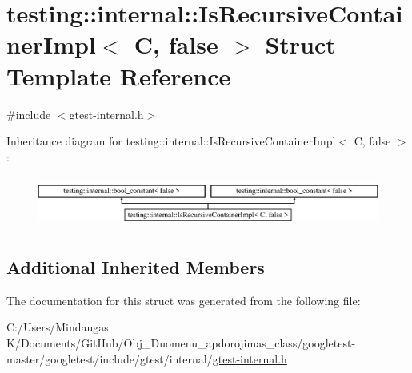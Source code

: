 \hypertarget{structtesting_1_1internal_1_1_is_recursive_container_impl_3_01_c_00_01false_01_4}{}\section{testing\+::internal\+::Is\+Recursive\+Container\+Impl$<$ C, false $>$ Struct Template Reference}
\label{structtesting_1_1internal_1_1_is_recursive_container_impl_3_01_c_00_01false_01_4}


{\ttfamily \#include $<$gtest-\/internal.\+h$>$}

Inheritance diagram for testing\+::internal\+::Is\+Recursive\+Container\+Impl$<$ C, false $>$\+:\begin{figure}[H]
\begin{center}
\leavevmode
\includegraphics[height=1.739130cm]{d6/d81/structtesting_1_1internal_1_1_is_recursive_container_impl_3_01_c_00_01false_01_4}
\end{center}
\end{figure}
\subsection*{Additional Inherited Members}


The documentation for this struct was generated from the following file\+:\begin{DoxyCompactItemize}
\item 
C\+:/\+Users/\+Mindaugas K/\+Documents/\+Git\+Hub/\+Obj\+\_\+\+Duomenu\+\_\+apdorojimas\+\_\+class/googletest-\/master/googletest/include/gtest/internal/\mbox{\hyperlink{googletest-master_2googletest_2include_2gtest_2internal_2gtest-internal_8h}{gtest-\/internal.\+h}}\end{DoxyCompactItemize}
